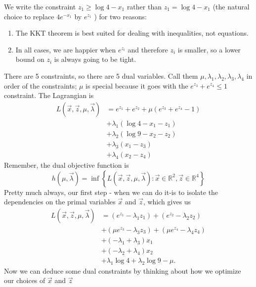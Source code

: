 \documentclass[11pt,a4paper]{article}
\begin{document}
We write the constraint $z_1 \geq \log 4-x_1$ rather than $z_1=\log 4-x_1$ (the natural choice to replace $4 e^{-x_1}$ by $e^{z_1}$ ) for two reasons:
\begin{enumerate}[$\bullet$]
    \item The KKT theorem is best suited for dealing with inequalities, not equations.
    \item In all cases, we are happier when $e^{z_i}$ and therefore $z_i$ is smaller, so a lower bound on $z_i$ is always going to be tight.
\end{enumerate}
There are 5 constraints, so there are 5 dual variables. Call them $\mu, \lambda_1, \lambda_2, \lambda_3, \lambda_4$ in order of the constraints; $\mu$ is special because it goes with the $e^{z_3}+e^{z_4} \leq 1$ constraint.
The Lagrangian is
$$
\begin{aligned}
L(\vec{x}, \vec{z}, \mu, \vec{\lambda}) &=e^{z_1}+e^{z_2}+\mu\left(e^{z_3}+e^{z_4}-1\right) \\
&+\lambda_1\left(\log 4-x_1-z_1\right) \\
&+\lambda_2\left(\log 9-x_2-z_2\right) \\
&+\lambda_3\left(x_1-z_3\right) \\
&+\lambda_4\left(x_2-z_4\right)
\end{aligned}
$$
Remember, the dual objective function is $$h(\mu, \vec{\lambda})=\inf \left\{L(\vec{x}, \vec{z}, \mu, \vec{\lambda}): \vec{x} \in \mathbb{R}^2, \vec{z} \in \mathbb{R}^4\right\}$$
Pretty much always, our first step - when we can do it-is to isolate the dependencies on the primal variables $\vec{x}$ and $\vec{z}$, which gives us
$$
\begin{aligned}
L(\vec{x}, \vec{z}, \mu, \vec{\lambda}) &=\left(e^{z_1}-\lambda_1 z_1\right)+\left(e^{z_2}-\lambda_2 z_2\right) \\
&+\left(\mu e^{z_3}-\lambda_3 z_3\right)+\left(\mu e^{z_4}-\lambda_4 z_4\right) \\
&+\left(-\lambda_1+\lambda_3\right) x_1 \\
&+\left(-\lambda_2+\lambda_4\right) x_2 \\
&+\lambda_1 \log 4+\lambda_2 \log 9-\mu .
\end{aligned}
$$
Now we can deduce some dual constraints by thinking about how we optimize our choices of $\vec{x}$ and $\vec{z}$
\end{document}
